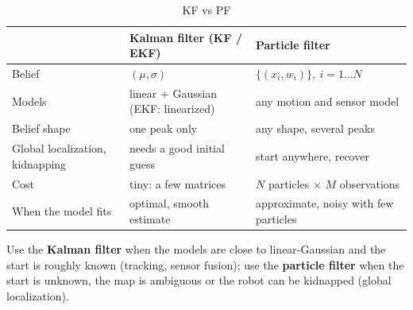 \begin{table}[H]
    \centering
    \small
    \begin{tabular}{|l|p{5.5cm}|p{5.5cm}|}
        \hline
         & \textbf{Kalman filter (KF / EKF)} & \textbf{Particle filter} \\
        \hline
        Belief & $(\mu, \sigma)$ & $\{(x_i, w_i)\},\ i = 1 \dots N$ \\
        \hline
        Models & linear + Gaussian (EKF: linearized) & any motion and sensor model \\
        \hline
        Belief shape & one peak only & any shape, several peaks \\
        \hline
        Global localization, kidnapping & needs a good initial guess & start anywhere, recover \\
        \hline
        Cost & tiny: a few matrices & $N$ particles $\times$ $M$ observations \\
        \hline
        When the model fits & optimal, smooth estimate & approximate, noisy with few particles \\
        \hline
    \end{tabular}
    \caption{KF vs PF}
\end{table}

Use the \textbf{Kalman filter} when the models are close to linear-Gaussian and the start is roughly known (tracking, sensor fusion); use the \textbf{particle filter} when the start is unknown, the map is ambiguous or the robot can be kidnapped (global localization).

